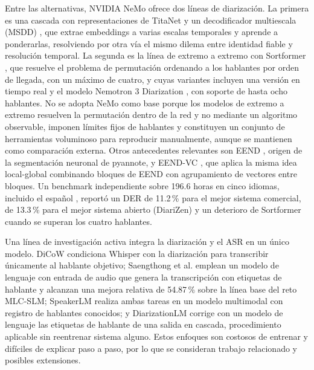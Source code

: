 \documentclass[11pt,a4paper]{article}
\begin{document}
Entre las alternativas, NVIDIA NeMo ofrece dos líneas de diarización. La primera es una cascada con representaciones de TitaNet \cite{koluguri2021} y un decodificador multiescala (MSDD) \cite{park2022}, que extrae embeddings a varias escalas temporales y aprende a ponderarlas, resolviendo por otra vía el mismo dilema entre identidad fiable y resolución temporal. La segunda es la línea de extremo a extremo con Sortformer \cite{park2024}, que resuelve el problema de permutación ordenando a los hablantes por orden de llegada, con un máximo de cuatro, y cuyas variantes incluyen una versión en tiempo real \cite{streaming2025} y el modelo Nemotron 3 Diarization \cite{nemotron2026}, con soporte de hasta ocho hablantes. No se adopta NeMo como base porque los modelos de extremo a extremo resuelven la permutación dentro de la red y no mediante un algoritmo observable, imponen límites fijos de hablantes y constituyen un conjunto de herramientas voluminoso para reproducir manualmente, aunque se mantienen como comparación externa. Otros antecedentes relevantes son EEND \cite{fujita2019}, origen de la segmentación neuronal de pyannote, y EEND-VC \cite{kinoshita2020}, que aplica la misma idea local-global combinando bloques de EEND con agrupamiento de vectores entre bloques. Un benchmark independiente sobre 196.6 horas en cinco idiomas, incluido el español \cite{benchmark2025}, reportó un DER de 11.2\,\% para el mejor sistema comercial, de 13.3\,\% para el mejor sistema abierto (DiariZen) y un deterioro de Sortformer cuando se superan los cuatro hablantes.

Una línea de investigación activa integra la diarización y el ASR en un único modelo. DiCoW \cite{polok2024} condiciona Whisper con la diarización para transcribir únicamente al hablante objetivo; Saengthong et al. \cite{saengthong2025} emplean un modelo de lenguaje con entrada de audio que genera la transcripción con etiquetas de hablante y alcanzan una mejora relativa de 54.87\,\% sobre la línea base del reto MLC-SLM; SpeakerLM \cite{speakerlm2025} realiza ambas tareas en un modelo multimodal con registro de hablantes conocidos; y DiarizationLM \cite{wang2024dlm} corrige con un modelo de lenguaje las etiquetas de hablante de una salida en cascada, procedimiento aplicable sin reentrenar sistema alguno. Estos enfoques son costosos de entrenar y difíciles de explicar paso a paso, por lo que se consideran trabajo relacionado y posibles extensiones.
\end{document}
